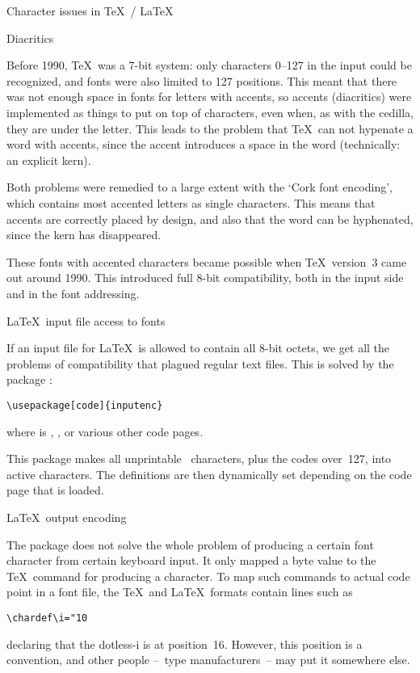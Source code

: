  {Character issues in \TeX\ / \LaTeX}

 {Diacritics}

Before 1990, \TeX\ was a 7-bit system: only characters 0--127 in the
input could be recognized, and fonts were also limited to 127
positions. This meant that there was not enough space in fonts for
letters with accents,
so accents (diacritics) were
implemented as things to put on top of characters, even when, as with
the cedilla, they are under the letter. This leads to the problem that
\TeX\ can not
hypenate a word with accents, since the accent introduces a space in
the word (technically: an explicit kern).

Both problems were remedied to a large extent with the `Cork font
encoding', which contains most accented letters as single
characters. This means that accents are correctly placed by design,
and also that the word can be hyphenated, since the kern has disappeared.

These fonts with accented characters became possible when
\TeX\ version~3 came out around 1990. This introduced full 8-bit
compatibility, both in the input side and in the font addressing.

 {\LaTeX\ input file access to fonts}

If an input file for \LaTeX\ is allowed to contain all 8-bit octets,
we get all the problems of compatibility that plagued regular text
files. This is solved by the package :
\begin{verbatim}
\usepackage[code]{inputenc}
\end{verbatim}
where  is , , or various other
code pages.

This package makes all unprintable \ascii\ characters, plus the codes
over~127, into active characters. The definitions are then dynamically
set depending on the code page that is loaded.

 {\LaTeX\ output encoding}

The  package does not solve the whole problem of producing
a certain font character from certain keyboard input. It only mapped a
byte value to the \TeX\ command for producing a character. To map such
commands to actual code point in a font file, the \TeX\ and
\LaTeX\ formats contain lines such as
\begin{verbatim}
\chardef\i="10
\end{verbatim}
declaring that the dotless-i is at position~16. However, this position
is a convention, and other people --~type manufacturers~-- may put it
somewhere else.

